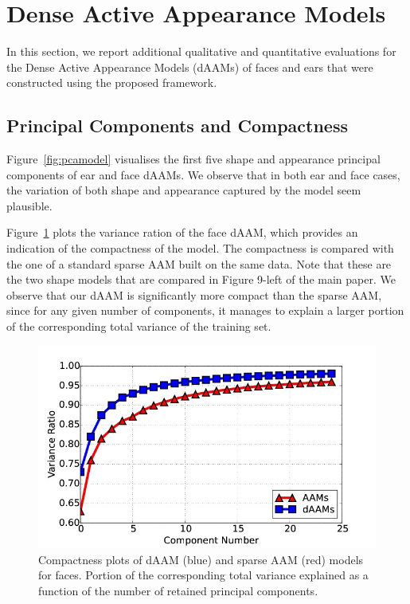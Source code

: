 \section{Dense Active Appearance Models}
\label{sec:daam}

In this section, we report additional qualitative and quantitative evaluations for the Dense Active Appearance Models (dAAMs) of faces and ears that were constructed using the proposed framework.



\subsection{Principal Components and Compactness}



Figure~\ref{fig:pcamodel} visualises the first five shape and appearance principal components of ear and face dAAMs. We observe that in both ear and face cases, the variation of both shape and appearance captured by the model seem plausible.


Figure~\ref{fig:compact} plots the variance ration of the face dAAM, which provides an indication of the compactness of the model. The compactness is compared with the one of a standard sparse AAM built on the same data. Note that these are the two shape models that are compared in Figure 9-left of the main paper. We observe that our dAAM is significantly more compact than the sparse AAM, since for any given number of components, it manages to explain a larger portion of the corresponding total variance of the training set. 


\begin{figure}[!t]
    \centering
    \includegraphics[width=\columnwidth]{resources/Annotation_Correction/Suplementory_Meterial/Model_Analysis/cumu_var_ratio}
    \caption{Compactness plots of dAAM (blue) and sparse AAM (red) models for faces. Portion of the corresponding total variance explained as a function of the number of retained principal components.}
    \label{fig:compact}
\end{figure}

